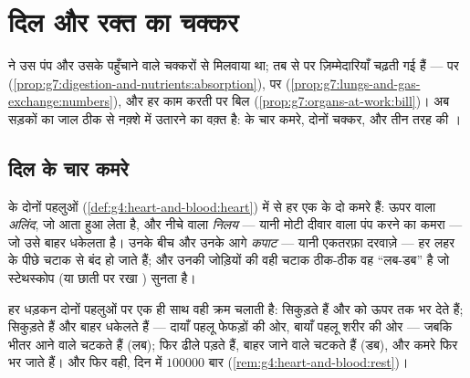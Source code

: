 \chapter{दिल और रक्त का चक्कर}\label{ch:g7:heart-and-circulation}

 ने उस पंप और उसके पहुँचाने वाले चक्करों
से मिलवाया था; तब से  पर ज़िम्मेदारियाँ चढ़ती गई हैं ---  पर
 (\cref{prop:g7:digestion-and-nutrients:absorption}),
 पर 
(\cref{prop:g7:lungs-and-gas-exchange:numbers}), और हर काम करती 
पर बिल (\cref{prop:g7:organs-at-work:bill})। अब सड़कों का जाल ठीक से
नक़्शे में उतारने का वक़्त है:  के चार कमरे, दोनों चक्कर, और तीन तरह
की ।

\section{दिल के चार कमरे}

\begin{definition}[अलिंद और निलय]\label{def:g7:heart-and-circulation:rooms}
 के दोनों पहलुओं (\cref{def:g4:heart-and-blood:heart}) में से हर एक
के दो कमरे हैं: ऊपर वाला \emph{अलिंद}, जो आता हुआ 
लेता है, और नीचे वाला \emph{निलय} --- यानी मोटी दीवार वाला
पंप करने का कमरा --- जो उसे बाहर धकेलता है। उनके बीच और उनके आगे
\emph{कपाट} --- यानी एकतरफ़ा दरवाज़े --- हर लहर के
पीछे चटाक से बंद हो जाते हैं; और उनकी जोड़ियों की वही चटाक ठीक-ठीक वह
``लब-डब'' है जो स्टेथस्कोप (या छाती पर रखा ) सुनता है।
\end{definition}

\begin{proposition}[एक धड़कन, क्रम से]\label{prop:g7:heart-and-circulation:beat}
हर धड़कन दोनों पहलुओं पर एक ही साथ वही क्रम चलाती है:  सिकुड़ते
हैं और  को ऊपर तक भर देते हैं;  सिकुड़ते हैं और  बाहर
धकेलते हैं --- दायाँ पहलू फेफड़ों की ओर, बायाँ पहलू शरीर की ओर ---
जबकि भीतर आने वाले  चटकते हैं (लब); फिर  ढीले पड़ते हैं, बाहर
जाने वाले  चटकते हैं (डब), और कमरे फिर भर जाते हैं। और फिर वही, दिन
में $100000$ बार (\cref{rem:g4:heart-and-blood:rest})।
\end{proposition}
\admitted

